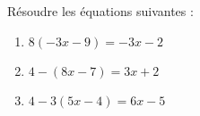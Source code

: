 \documentclass[a4paper,11pt,exos]{nsi} %
\begin{document}
\maketitle

\begin{exercice}
    Résoudre les équations suivantes :
    \begin{multicols}{3}
        \begin{enumerate}
            \item $8(-3x-9)=-3x-2$
			\item $4-(8x-7)=3x+2$
			\item $4-3(5x-4)=6x-5$
        \end{enumerate}
    \end{multicols}
    
\end{exercice}
\end{document}

